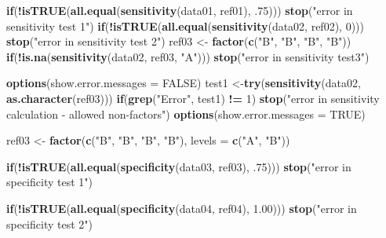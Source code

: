 \documentclass[]{article}
\newenvironment{Shaded}{\begin{snugshade}}{\end{snugshade}}
\newcommand{\ControlFlowTok}[1]{\textcolor[rgb]{0.13,0.29,0.53}{\textbf{#1}}}
\newcommand{\DataTypeTok}[1]{\textcolor[rgb]{0.13,0.29,0.53}{#1}}
\newcommand{\DecValTok}[1]{\textcolor[rgb]{0.00,0.00,0.81}{#1}}
\newcommand{\FloatTok}[1]{\textcolor[rgb]{0.00,0.00,0.81}{#1}}
\newcommand{\KeywordTok}[1]{\textcolor[rgb]{0.13,0.29,0.53}{\textbf{#1}}}
\newcommand{\NormalTok}[1]{#1}
\newcommand{\OperatorTok}[1]{\textcolor[rgb]{0.81,0.36,0.00}{\textbf{#1}}}
\newcommand{\OtherTok}[1]{\textcolor[rgb]{0.56,0.35,0.01}{#1}}
\newcommand{\StringTok}[1]{\textcolor[rgb]{0.31,0.60,0.02}{#1}}
\begin{document}
\begin{Shaded}
\begin{Highlighting}[]
\ControlFlowTok{if}\NormalTok{(}\OperatorTok{!}\KeywordTok{isTRUE}\NormalTok{(}\KeywordTok{all.equal}\NormalTok{(}\KeywordTok{sensitivity}\NormalTok{(data01, ref01), }\FloatTok{.75}\NormalTok{))) }\KeywordTok{stop}\NormalTok{(}\StringTok{"error in sensitivity test 1"}\NormalTok{)}
\ControlFlowTok{if}\NormalTok{(}\OperatorTok{!}\KeywordTok{isTRUE}\NormalTok{(}\KeywordTok{all.equal}\NormalTok{(}\KeywordTok{sensitivity}\NormalTok{(data02, ref02), }\DecValTok{0}\NormalTok{))) }\KeywordTok{stop}\NormalTok{(}\StringTok{"error in sensitivity test 2"}\NormalTok{)}
\NormalTok{ref03 <-}\StringTok{ }\KeywordTok{factor}\NormalTok{(}\KeywordTok{c}\NormalTok{(}\StringTok{"B"}\NormalTok{, }\StringTok{"B"}\NormalTok{, }\StringTok{"B"}\NormalTok{, }\StringTok{"B"}\NormalTok{))}
\ControlFlowTok{if}\NormalTok{(}\OperatorTok{!}\KeywordTok{is.na}\NormalTok{(}\KeywordTok{sensitivity}\NormalTok{(data02, ref03, }\StringTok{"A"}\NormalTok{))) }\KeywordTok{stop}\NormalTok{(}\StringTok{"error in sensitivity test3"}\NormalTok{)}
      
   \KeywordTok{options}\NormalTok{(}\DataTypeTok{show.error.messages =} \OtherTok{FALSE}\NormalTok{)}
\NormalTok{   test1 <-}\KeywordTok{try}\NormalTok{(}\KeywordTok{sensitivity}\NormalTok{(data02, }\KeywordTok{as.character}\NormalTok{(ref03)))}
   \ControlFlowTok{if}\NormalTok{(}\KeywordTok{grep}\NormalTok{(}\StringTok{"Error"}\NormalTok{, test1) }\OperatorTok{!=}\StringTok{ }\DecValTok{1}\NormalTok{)}
      \KeywordTok{stop}\NormalTok{(}\StringTok{"error in sensitivity calculation - allowed non-factors"}\NormalTok{)}
   \KeywordTok{options}\NormalTok{(}\DataTypeTok{show.error.messages =} \OtherTok{TRUE}\NormalTok{)}
   
   
\NormalTok{   ref03 <-}\StringTok{ }\KeywordTok{factor}\NormalTok{(}\KeywordTok{c}\NormalTok{(}\StringTok{"B"}\NormalTok{, }\StringTok{"B"}\NormalTok{, }\StringTok{"B"}\NormalTok{, }\StringTok{"B"}\NormalTok{), }\DataTypeTok{levels =} \KeywordTok{c}\NormalTok{(}\StringTok{"A"}\NormalTok{, }\StringTok{"B"}\NormalTok{))}
   
   \ControlFlowTok{if}\NormalTok{(}\OperatorTok{!}\KeywordTok{isTRUE}\NormalTok{(}\KeywordTok{all.equal}\NormalTok{(}\KeywordTok{specificity}\NormalTok{(data03, ref03), }\FloatTok{.75}\NormalTok{))) }\KeywordTok{stop}\NormalTok{(}\StringTok{"error in specificity test 1"}\NormalTok{)}

   \ControlFlowTok{if}\NormalTok{(}\OperatorTok{!}\KeywordTok{isTRUE}\NormalTok{(}\KeywordTok{all.equal}\NormalTok{(}\KeywordTok{specificity}\NormalTok{(data04, ref04), }\FloatTok{1.00}\NormalTok{))) }\KeywordTok{stop}\NormalTok{(}\StringTok{"error in specificity test 2"}\NormalTok{)}


\end{Highlighting}
\end{Shaded}
\end{document}
